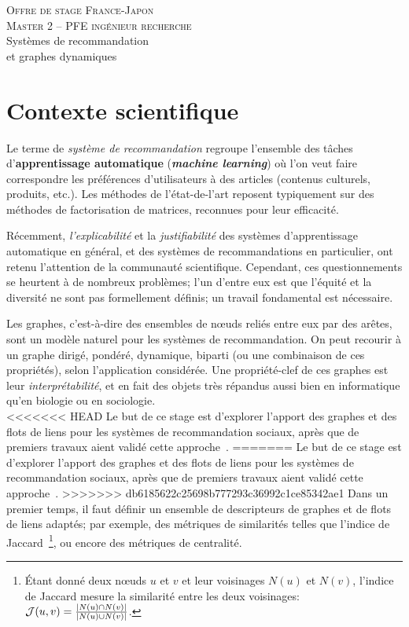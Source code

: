 \documentclass[a4paper, 12pt]{article}
\newcommand{\dest}{ 
    \textsc{\Large Offre de stage France-Japon\\ 
    Master 2 -- PFE ingénieur recherche}\\[1ex]
    {\Huge Systèmes de recommandation \\
    et graphes dynamiques}
  }
\begin{document}
\pagestyle{fancy} 

\addvspace{1cm}
\begin{center}
  \dest
\end{center}

\addvspace{1cm}

\section*{Contexte scientifique}

Le terme de {\em système de recommandation} regroupe l'ensemble des tâches d'{\bf apprentissage automatique} ({\bf {\em machine learning}}) où l'on veut faire correspondre les préférences d'utilisateurs à des articles (contenus culturels, produits, etc.). Les méthodes de l'état-de-l'art reposent typiquement sur des méthodes de factorisation de matrices, reconnues pour leur efficacité.

Récemment, {\em l'explicabilité} et la {\em justifiabilité} des systèmes d'apprentissage automatique en général, et des systèmes de recommandations en particulier, ont retenu l'attention de la communauté scientifique.
Cependant, ces questionnements se heurtent à de nombreux problèmes; l'un d'entre eux est que l'équité et la diversité ne sont pas formellement définis; un travail fondamental est nécessaire.

Les graphes, c'est-à-dire des ensembles de n\oe{}uds reliés entre eux par des arêtes, sont un modèle naturel pour les systèmes de recommandation.
On peut recourir à un graphe dirigé, pondéré, dynamique, biparti (ou une combinaison de ces propriétés), selon l'application considérée.
Une propriété-clef de ces graphes est leur {\em interprétabilité}, et en fait des objets très répandus aussi bien en informatique qu'en biologie ou en sociologie.\\

<<<<<<< HEAD
Le but de ce stage est d'explorer l'apport des graphes et des flots de liens pour les systèmes de recommandation sociaux, après que de premiers travaux aient validé cette approche~\cite{viard2018augmenting}.
=======
Le but de ce stage est d'explorer l'apport des graphes et des flots de liens pour les systèmes de recommandation sociaux, après que de premiers travaux aient validé cette approche~\cite{VIARD2019127}.
>>>>>>> db6185622c25698b777293c36992c1ce85342ae1
Dans un premier temps, il faut définir un ensemble de descripteurs de graphes et de flots de liens adaptés; par exemple, des métriques de similarités telles que l'indice de Jaccard~\footnote{Étant donné deux n\oe{}uds $u$ et $v$ et leur voisinages $N(u)$ et $N(v)$, l'indice de Jaccard mesure la similarité entre les deux voisinages: ${\cal J}(u,v) = \frac{|N(u)\cap N(v)|}{|N(u) \cup N(v)|}$.}, ou encore des métriques de centralité.
\end{document}
